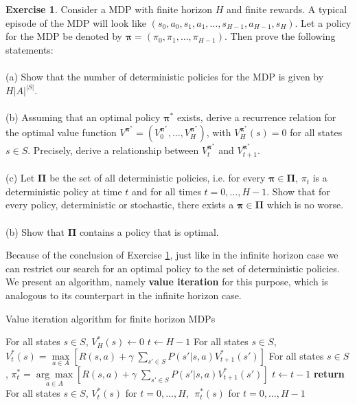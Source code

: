 \documentclass{article}
\theoremstyle{definition}
\newtheorem{exercise}{Exercise}[section]
\theoremstyle{remark}
\begin{document}
\begin{exercise}
Consider a MDP with finite horizon $H$ and finite rewards. A typical episode of the MDP will look like $(s_0,a_0,s_1,a_1,\dots,s_{H-1},a_{H-1},s_H)$. Let a policy for the MDP be denoted by $\bm{\pi} = (\pi_0,\pi_1,\dots,\pi_{H-1})$. Then prove the following statements:\\
\\
(a) Show that the number of deterministic policies for the MDP is given by $H|A|^{|S|}$.\\
\\
(b) Assuming that an optimal policy $\bm{\pi^{\ast}}$ exists, derive a recurrence relation for the optimal value function $V^{\bm{\pi^{\ast}}} = (V^{\bm{\pi^{\ast}}}_0,\dots,V^{\bm{\pi^{\ast}}}_H)$, with $V^{\bm{\pi^{\ast}}}_H(s) = 0$ for all states $s \in S$. Precisely, derive a relationship between $V^{\bm{\pi^{\ast}}}_t$ and $V^{\bm{\pi^{\ast}}}_{t+1}$.\\
\\
(c) Let $\bm{\Pi}$ be the set of all deterministic policies, i.e. for every $\bm{\pi} \in \bm{\Pi}$, $\pi_t$ is a deterministic policy at time $t$ and for all times $t=0,\dots,H-1$. Show that for every policy, deterministic or stochastic, there exists a $\bm{\pi} \in \bm{\Pi}$ which is no worse.\\
\\
(b) Show that $\bm{\Pi}$ contains a policy that is optimal.
\label{ex-finite-MDP-control}
\end{exercise}

Because of the conclusion of Exercise \ref{ex-finite-MDP-control}, just like in the infinite horizon case we can restrict our search for an optimal policy to the set of deterministic policies. We present an algorithm, namely \textbf{value iteration} for this purpose, which is analogous to its counterpart in the infinite horizon case.

\begin{algorithm}
\caption{Value iteration algorithm for finite horizon MDPs}\label{alg:mdp6}
\begin{algorithmic}[1]
\State For all states $s \in S$, $V^{\ast}_H(s)\gets 0$
\State $t \gets H-1$
\State For all states $s \in S$, $V^{\ast}_t(s) = \underset{a \in A}{\max} \left[ R(s,a) + \gamma \; \sum_{s' \in S} P(s'|s,a) V^{\ast}_{t+1}(s') \right]$
\State For all states $s \in S$, $\pi^{\ast}_t = \underset{a \in A}{\arg\max} \left[ R(s,a) + \gamma \; \sum_{s' \in S} P(s'|s,a) V^{\ast}_{t+1}(s') \right]$
\State $t \gets t-1$
\EndWhile\label{mdp6label}
\State \textbf{return} For all states $s \in S$, $V^{\ast}_t(s)$ for $t=0,\dots,H$, $\; \pi^{\ast}_t(s)$ for $t=0,\dots,H-1$
\EndProcedure
\end{algorithmic}
\end{algorithm}
\end{document}
